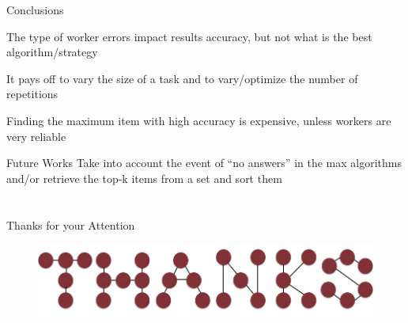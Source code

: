\documentclass{beamer}
\begin{document}
\begin{frame}{Conclusions}
		\begin{block}{}
		The type of worker errors impact results accuracy, but not what is the best algorithm/strategy
		\end{block}
		\pause
		\begin{block}{}
		It pays off to vary the size of a task and to vary/optimize the number of repetitions
		\end{block}
		\pause
		\begin{block}{}
			Finding the maximum item with high accuracy is expensive, unless workers are very reliable
		\end{block}
		\pause
		\begin{block}{Future Works}
			Take into account the event of “no answers” in the max algorithms and/or retrieve the top-k items from a set and sort them
		\end{block}
\end{frame}
\section{}
\begin{frame}{Thanks for your Attention}
	\begin{figure}
		\center
		\includegraphics[scale=0.35]{images/thanks.png}
		\end{figure}
\end{frame}
\end{document}
